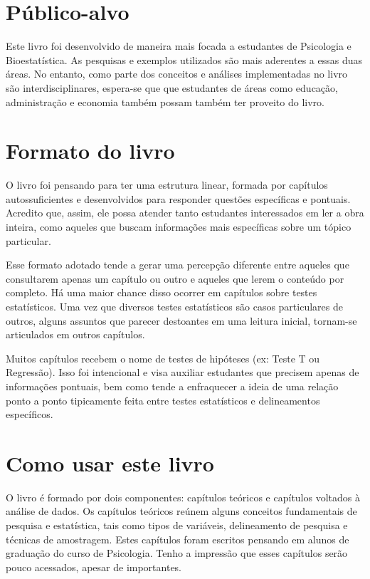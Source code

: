 \documentclass[
]{book}
\begin{document}
\hypertarget{puxfablico-alvo}{%
\section{Público-alvo}\label{puxfablico-alvo}}

Este livro foi desenvolvido de maneira mais focada a estudantes de Psicologia e Bioestatística. As pesquisas e exemplos utilizados são mais aderentes a essas duas áreas. No entanto, como parte dos conceitos e análises implementadas no livro são interdisciplinares, espera-se que que estudantes de áreas como educação, administração e economia também possam também ter proveito do livro.

\hypertarget{formato-do-livro}{%
\section{Formato do livro}\label{formato-do-livro}}

O livro foi pensando para ter uma estrutura linear, formada por capítulos autossuficientes e desenvolvidos para responder questões específicas e pontuais. Acredito que, assim, ele possa atender tanto estudantes interessados em ler a obra inteira, como aqueles que buscam informações mais específicas sobre um tópico particular.

Esse formato adotado tende a gerar uma percepção diferente entre aqueles que consultarem apenas um capítulo ou outro e aqueles que lerem o conteúdo por completo. Há uma maior chance disso ocorrer em capítulos sobre testes estatísticos. Uma vez que diversos testes estatísticos são casos particulares de outros, alguns assuntos que parecer destoantes em uma leitura inicial, tornam-se articulados em outros capítulos.

Muitos capítulos recebem o nome de testes de hipóteses (ex: Teste T ou Regressão). Isso foi intencional e visa auxiliar estudantes que precisem apenas de informações pontuais, bem como tende a enfraquecer a ideia de uma relação ponto a ponto tipicamente feita entre testes estatísticos e delineamentos específicos.

\hypertarget{como-usar-este-livro}{%
\section{Como usar este livro}\label{como-usar-este-livro}}

O livro é formado por dois componentes: capítulos teóricos e capítulos voltados à análise de dados. Os capítulos teóricos reúnem alguns conceitos fundamentais de pesquisa e estatística, tais como tipos de variáveis, delineamento de pesquisa e técnicas de amostragem. Estes capítulos foram escritos pensando em alunos de graduação do curso de Psicologia. Tenho a impressão que esses capítulos serão pouco acessados, apesar de importantes.
\end{document}
